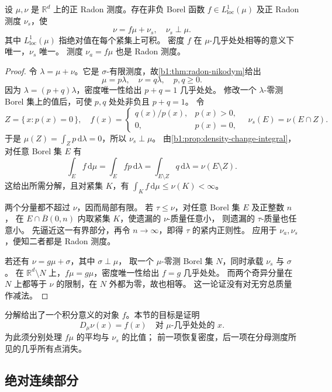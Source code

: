 \begin{proposition}\label{b1:prop:radon-lebesgue-decomposition}
设 \(\mu,\nu\) 是 \(\mathbb R^d\) 上的正 Radon 测度。存在非负 Borel 函数 \(f\in L^1_{\mathrm{loc}}(\mu)\) 及正 Radon 测度 \(\nu_s\)，使
\[
 \nu=f\mu+\nu_s,\quad \nu_s\perp\mu.
\]
其中 \(L^1_{\mathrm{loc}}(\mu)\) 指绝对值在每个紧集上可积。
密度 \(f\) 在 \(\mu\)-几乎处处相等的意义下唯一，\(\nu_s\) 唯一。
测度 \(\nu_a=f\mu\) 也是 Radon 测度。
\end{proposition}
\begin{proof}
令 \(\lambda=\mu+\nu\)。它是 \(\sigma\)-有限测度，故\cref{b1:thm:radon-nikodym}给出
\[
 \mu=p\lambda,\quad \nu=q\lambda,\quad p,q\geq0.
\]
因为 \(\lambda=(p+q)\lambda\)，密度唯一性给出 \(p+q=1\) 几乎处处。
修改一个 \(\lambda\)-零测 Borel 集上的值后，可使 \(p,q\) 处处非负且 \(p+q=1\)。
令
\[
 Z=\{\,x:p(x)=0\,\},\quad
 f(x)=
 \begin{cases}
 q(x)/p(x),&p(x)>0,\\
 0,&p(x)=0,
 \end{cases}
 \quad \nu_s(E)=\nu(E\cap Z).
\]
于是 \(\mu(Z)=\int_Zp\,\mathrm d\lambda=0\)，所以 \(\nu_s\perp\mu\)。
由\cref{b1:prop:density-change-integral}，对任意 Borel 集 \(E\) 有
\[
 \int_E f\,\mathrm d\mu
 =\int_E fp\,\mathrm d\lambda
 =\int_{E\setminus Z}q\,\mathrm d\lambda
 =\nu(E\setminus Z).
\]
这给出所需分解，且对紧集 \(K\)，有 \(\int_K f\,\mathrm d\mu\leq\nu(K)<\infty\)。

两个分量都不超过 \(\nu\)，因而局部有限。
若 \(\tau\leq\nu\)，对任意 Borel 集 \(E\) 及正整数 \(n\)，
在 \(E\cap\overline B(0,n)\) 内取紧集 \(K\)，使遗漏的 \(\nu\)-质量任意小，
则遗漏的 \(\tau\)-质量也任意小。
先逼近这一有界部分，再令 \(n\to\infty\)，即得 \(\tau\) 的紧内正则性。
应用于 \(\nu_a,\nu_s\)，便知二者都是 Radon 测度。

若还有 \(\nu=g\mu+\sigma\)，其中 \(\sigma\perp\mu\)，
取一个 \(\mu\)-零测 Borel 集 \(N\)，同时承载 \(\nu_s\) 与 \(\sigma\)。
在 \(\mathbb R^d\setminus N\) 上，\(f\mu=g\mu\)，密度唯一性给出 \(f=g\) 几乎处处。
而两个奇异分量在 \(N\) 上都等于 \(\nu\) 的限制，在 \(N\) 外都为零，故也相等。
这一论证没有对无穷总质量作减法。
\end{proof}

分解给出了一个积分意义的对象 \(f\)。本节的目标是证明
\[
 D_\mu\nu(x)=f(x)\quad\text{对 }\mu\text{-几乎处处的 }x.
\]
为此须分别处理 \(f\mu\) 的平均与 \(\nu_s\) 的比值；
前一项恢复密度，后一项在分母测度所见的几乎所有点消失。

\subsection{绝对连续部分}
\label{b1:subsec:140302}

